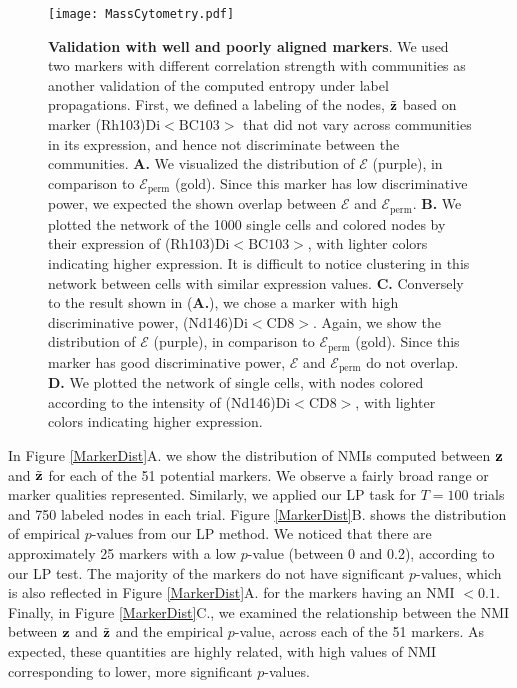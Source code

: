 \begin{figure}[h!]
\begin{center}
\texttt{[image: MassCytometry.pdf]}
\caption{{\bf Validation with well and poorly aligned markers}. We used two markers with different correlation strength with communities as another validation of the computed entropy under label propagations. First, we defined a labeling of the nodes, $\tilde{\bf z}$ based on marker (Rh103)Di$<\text{BC103}>$ that did not vary across communities in its expression, and hence not discriminate between the communities. {\bf A.} We visualized the distribution of $\mathcal{E}$ (purple), in comparison to  $\mathcal{E}_{\text{perm}}$ (gold). Since this marker has low discriminative power, we expected the shown overlap between $\mathcal{E}$ and $\mathcal{E}_{\text{perm}}$. {\bf B.} We plotted the network of the 1000 single cells and colored nodes by their expression of (Rh103)Di$<\text{BC103}>$, with lighter colors indicating higher expression. It is difficult to notice clustering in this network between cells with similar expression values. {\bf C.} Conversely to the result shown in ({\bf A.}), we chose a marker with high discriminative power, (Nd146)Di$<\text{CD}8>$. Again, we show the distribution of $\mathcal{E}$ (purple), in comparison to  $\mathcal{E}_{\text{perm}}$ (gold). Since this marker has good discriminative power, $\mathcal{E}$ and $\mathcal{E}_{\text{perm}}$ do not overlap. {\bf D.} We plotted the network of single cells, with nodes colored according to the intensity of (Nd146)Di$<\text{CD}8>$, with lighter colors indicating higher expression.}
\label{MassCy}
\end{center}
\end{figure}

In Figure \ref{MarkerDist}A. we show the distribution of NMIs computed between ${\bf z}$ and $\tilde{\bf z}$ for each of the 51 potential markers. We observe a fairly broad range or marker qualities represented. Similarly, we applied our LP task for $T=100$ trials and 750 labeled nodes in each trial. Figure \ref{MarkerDist}B. shows the distribution of empirical $p$-values from our LP method. We noticed that there are approximately 25 markers with a low $p$-value (between 0 and 0.2), according to our LP test. The majority of the markers do not have significant $p$-values, which is also reflected in Figure \ref{MarkerDist}A. for the markers having an NMI $<0.1$. Finally, in Figure \ref{MarkerDist}C., we examined the relationship between the NMI between ${\bf z}$ and $\tilde{\bf z}$ and the empirical $p$-value, across each of the 51 markers. As expected, these quantities are highly related, with high values of NMI corresponding to lower, more significant $p$-values.

